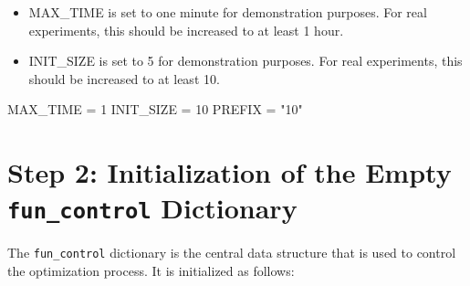 \documentclass[
  letterpaper,
  DIV=11,
  numbers=noendperiod]{scrreprt}
\newenvironment{Shaded}{\begin{snugshade}}{\end{snugshade}}
\newcommand{\DecValTok}[1]{\textcolor[rgb]{0.68,0.00,0.00}{#1}}
\newcommand{\NormalTok}[1]{\textcolor[rgb]{0.00,0.23,0.31}{#1}}
\newcommand{\OperatorTok}[1]{\textcolor[rgb]{0.37,0.37,0.37}{#1}}
\newcommand{\StringTok}[1]{\textcolor[rgb]{0.13,0.47,0.30}{#1}}
\providecommand{\tightlist}{%
  \setlength{\itemsep}{0pt}\setlength{\parskip}{0pt}}\usepackage{longtable,booktabs,array}
\begin{document}
\begin{tcolorbox}[enhanced jigsaw, titlerule=0mm, colbacktitle=quarto-callout-caution-color!10!white, coltitle=black, arc=.35mm, toptitle=1mm, colback=white, left=2mm, opacityback=0, bottomtitle=1mm, bottomrule=.15mm, breakable, opacitybacktitle=0.6, colframe=quarto-callout-caution-color-frame, rightrule=.15mm, toprule=.15mm, leftrule=.75mm, title=\textcolor{quarto-callout-caution-color}{\faFire}\hspace{0.5em}{Caution: Run time and initial design size should be increased for real
experiments}]

\begin{itemize}
\tightlist
\item
  MAX\_TIME is set to one minute for demonstration purposes. For real
  experiments, this should be increased to at least 1 hour.
\item
  INIT\_SIZE is set to 5 for demonstration purposes. For real
  experiments, this should be increased to at least 10.
\end{itemize}

\end{tcolorbox}

\begin{Shaded}
\begin{Highlighting}[]
\NormalTok{MAX\_TIME }\OperatorTok{=} \DecValTok{1}
\NormalTok{INIT\_SIZE }\OperatorTok{=} \DecValTok{10}
\NormalTok{PREFIX }\OperatorTok{=} \StringTok{"10"}
\end{Highlighting}
\end{Shaded}

\hypertarget{step-2-initialization-of-the-empty-fun_control-dictionary}{%
\section{\texorpdfstring{Step 2: Initialization of the Empty
\texttt{fun\_control}
Dictionary}{Step 2: Initialization of the Empty fun\_control Dictionary}}\label{step-2-initialization-of-the-empty-fun_control-dictionary}}

The \texttt{fun\_control} dictionary is the central data structure that
is used to control the optimization process. It is initialized as
follows:
\end{document}
